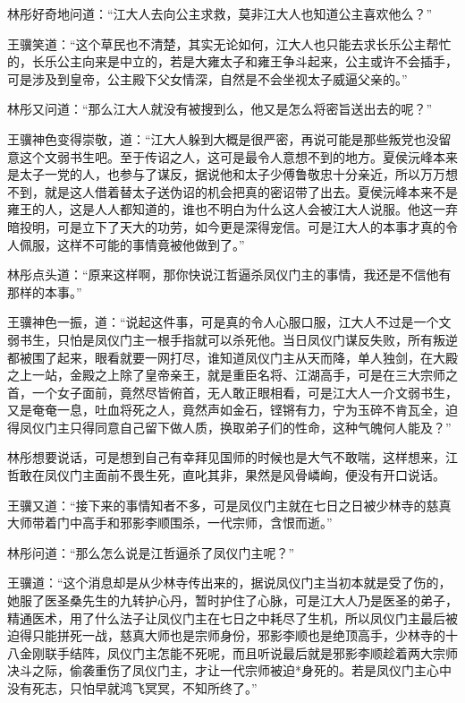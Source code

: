 林彤好奇地问道：“江大人去向公主求救，莫非江大人也知道公主喜欢他么？”

王骥笑道：“这个草民也不清楚，其实无论如何，江大人也只能去求长乐公主帮忙的，长乐公主向来是中立的，若是大雍太子和雍王争斗起来，公主或许不会插手，可是涉及到皇帝，公主殿下父女情深，自然是不会坐视太子威逼父亲的。”

林彤又问道：“那么江大人就没有被搜到么，他又是怎么将密旨送出去的呢？”

王骥神色变得崇敬，道：“江大人躲到大概是很严密，再说可能是那些叛党也没留意这个文弱书生吧。至于传诏之人，这可是最令人意想不到的地方。夏侯沅峰本来是太子一党的人，也参与了谋反，据说他和太子少傅鲁敬忠十分亲近，所以万万想不到，就是这人借着替太子送伪诏的机会把真的密诏带了出去。夏侯沅峰本来不是雍王的人，这是人人都知道的，谁也不明白为什么这人会被江大人说服。他这一弃暗投明，可是立下了天大的功劳，如今更是深得宠信。可是江大人的本事才真的令人佩服，这样不可能的事情竟被他做到了。”

林彤点头道：“原来这样啊，那你快说江哲逼杀凤仪门主的事情，我还是不信他有那样的本事。”

王骥神色一振，道：“说起这件事，可是真的令人心服口服，江大人不过是一个文弱书生，只怕是凤仪门主一根手指就可以杀死他。当日凤仪门谋反失败，所有叛逆都被围了起来，眼看就要一网打尽，谁知道凤仪门主从天而降，单人独剑，在大殿之上一站，金殿之上除了皇帝亲王，就是重臣名将、江湖高手，可是在三大宗师之首，一个女子面前，竟然尽皆俯首，无人敢正眼相看，可是江大人一介文弱书生，又是奄奄一息，吐血将死之人，竟然声如金石，铿锵有力，宁为玉碎不肯瓦全，迫得凤仪门主只得同意自己留下做人质，换取弟子们的性命，这种气魄何人能及？”

林彤想要说话，可是想到自己有幸拜见国师的时候也是大气不敢喘，这样想来，江哲敢在凤仪门主面前不畏生死，直叱其非，果然是风骨嶙峋，便没有开口说话。

王骥又道：“接下来的事情知者不多，可是凤仪门主就在七日之日被少林寺的慈真大师带着门中高手和邪影李顺围杀，一代宗师，含恨而逝。”

林彤问道：“那么怎么说是江哲逼杀了凤仪门主呢？”

王骥道：“这个消息却是从少林寺传出来的，据说凤仪门主当初本就是受了伤的，她服了医圣桑先生的九转护心丹，暂时护住了心脉，可是江大人乃是医圣的弟子，精通医术，用了什么法子让凤仪门主在七日之中耗尽了生机，所以凤仪门主最后被迫得只能拼死一战，慈真大师也是宗师身份，邪影李顺也是绝顶高手，少林寺的十八金刚联手结阵，凤仪门主怎能不死呢，而且听说最后就是邪影李顺趁着两大宗师决斗之际，偷袭重伤了凤仪门主，才让一代宗师被迫*身死的。若是凤仪门主心中没有死志，只怕早就鸿飞冥冥，不知所终了。”

